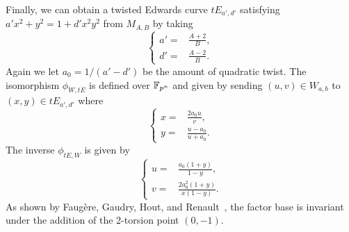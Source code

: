 Finally, we can obtain a twisted Edwards curve $tE_{a',d'}$ satisfying
$a'x^2 + y^2 = 1 + d'x^2y^2$ from $M_{A,B}$ by taking
\[ \left\{\begin{aligned}
a' = & \frac{A + 2}{B}, \\
d' = & \frac{A - 2}{B}.
\end{aligned}\right. \]
%
Again we let $a_0=1/(a' - d')$ be the amount of quadratic twist.
%
The isomorphism $\phi_{W,tE}$ is defined over $\mathbb F_{p^n}$ and given by
sending $(u,v)\in W_{a,b}$ to $(x,y)\in tE_{a',d'}$ where
\[ \left\{\begin{aligned}
x = & \frac{2a_0u}{v}, \\
y = & \frac{u - a_0}{u + a_0}.
\end{aligned}\right. \]
%
The inverse $\phi_{tE,W}$ is given by
\[ \left\{\begin{aligned}
u = & \frac{a_0(1 + y)}{1 - y}, \\
v = & \frac{2a_0^2(1 + y)}{x(1 - y)}.
\end{aligned}\right. \]
%
As shown by Faug\`ere, Gaudry, Hout, and
Renault~\cite{DBLP:conf/eurocrypt/FaugereHJRV14}, the factor base is
invariant under the addition of the 2-torsion point $(0,-1)$.

